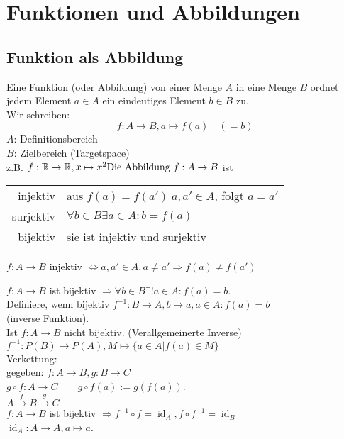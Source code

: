 \documentclass[../ana1.tex]{subfiles}
\begin{document}
\setcounter{section}{3}

\section{Funktionen und Abbildungen}
\subsection{Funktion als Abbildung}
\begin{defi}
	Eine Funktion (oder Abbildung) von einer Menge \(A\) in eine Menge \(B\) ordnet jedem Element \(a\in A\) ein eindeutiges Element \(b \in B\) zu.\\
	Wir schreiben:
	\begin{equation*}
		f: A \rightarrow B, a \mapsto f(a)\quad(=b)
	\end{equation*}
	\(A\): Definitionsbereich\\
	\(B\): Zielbereich (Targetspace)\\
	z.B. \(f: \R \rightarrow \R, x \mapsto x^2$\\
	Die Abbildung \(f: A \rightarrow B\) ist\\
	\begin{tabular}{r|l}
		injektiv  & aus \(f(a) = f(a') \; a, a' \in A\), folgt \(a=a'\) \\
		surjektiv & \(\forall b\in B \exists a\in A: b=f(a)\)           \\
		bijektiv  & sie ist injektiv und surjektiv
	\end{tabular}
\end{defi}
\begin{bem}
	\(f: A\rightarrow B\) injektiv \(\Leftrightarrow a, a'\in A, a \neq a' \Rightarrow f(a) \neq f(a')\)
\end{bem}
\(f: A\rightarrow B\) ist bijektiv \(\Rightarrow \forall b\in B \exists ! a\in A: f(a) = b\).\\
Definiere, wenn bijektiv \(f^{-1}: B\rightarrow A, b\mapsto a, a\in A: f(a) = b\) \\
(inverse Funktion).\\
Ist \(f: A\rightarrow B\) nicht bijektiv. (Verallgemeinerte Inverse)\\
\(f^{-1}: P(B)\rightarrow P(A), M \mapsto \{a\in A|f(a)\in M\} \) \\
Verkettung:\\
gegeben: \( f:A\rightarrow B, g: B\rightarrow C \) \\
\( g\circ f: A\rightarrow C\qquad g\circ f(a):= g(f(a)) \).\\
\( A\overset{f}{\rightarrow} B \overset{g}{\rightarrow}C\) \\
\(f: A\rightarrow B\) ist bijektiv \(\Rightarrow f^{-1}\circ f = \operatorname{id}_A, f\circ f^{-1} = \operatorname{id}_B\) \\
\(\operatorname{id}_A: A\rightarrow A, a\mapsto a\).
\end{document}
